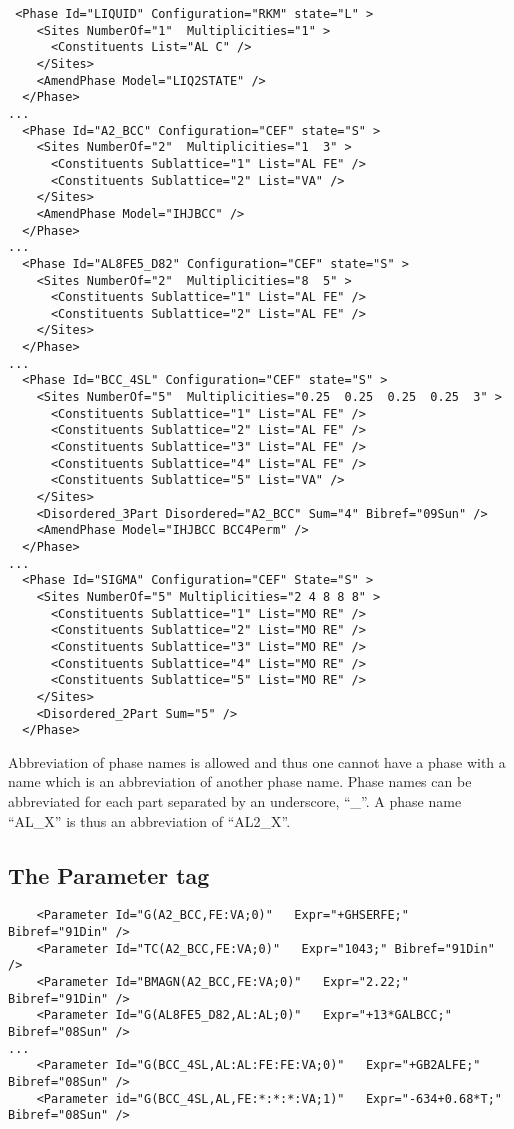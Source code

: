 \documentclass{article}
\begin{document}
\begin{appendices}
{\small
\begin{verbatim}
 <Phase Id="LIQUID" Configuration="RKM" state="L" >
    <Sites NumberOf="1"  Multiplicities="1" >
      <Constituents List="AL C" />
    </Sites>
    <AmendPhase Model="LIQ2STATE" />
  </Phase>
...
  <Phase Id="A2_BCC" Configuration="CEF" state="S" >
    <Sites NumberOf="2"  Multiplicities="1  3" >
      <Constituents Sublattice="1" List="AL FE" />
      <Constituents Sublattice="2" List="VA" />
    </Sites>
    <AmendPhase Model="IHJBCC" />
  </Phase>
...
  <Phase Id="AL8FE5_D82" Configuration="CEF" state="S" >
    <Sites NumberOf="2"  Multiplicities="8  5" >
      <Constituents Sublattice="1" List="AL FE" />
      <Constituents Sublattice="2" List="AL FE" />
    </Sites>
  </Phase>
...
  <Phase Id="BCC_4SL" Configuration="CEF" state="S" >
    <Sites NumberOf="5"  Multiplicities="0.25  0.25  0.25  0.25  3" >
      <Constituents Sublattice="1" List="AL FE" />
      <Constituents Sublattice="2" List="AL FE" />
      <Constituents Sublattice="3" List="AL FE" />
      <Constituents Sublattice="4" List="AL FE" />
      <Constituents Sublattice="5" List="VA" />
    </Sites>
    <Disordered_3Part Disordered="A2_BCC" Sum="4" Bibref="09Sun" />
    <AmendPhase Model="IHJBCC BCC4Perm" />
  </Phase>
...
  <Phase Id="SIGMA" Configuration="CEF" State="S" >
    <Sites NumberOf="5" Multiplicities="2 4 8 8 8" >
      <Constituents Sublattice="1" List="MO RE" />
      <Constituents Sublattice="2" List="MO RE" />
      <Constituents Sublattice="3" List="MO RE" />
      <Constituents Sublattice="4" List="MO RE" />
      <Constituents Sublattice="5" List="MO RE" />
    </Sites>
    <Disordered_2Part Sum="5" />
  </Phase>
\end{verbatim}
}

Abbreviation of phase names is allowed and thus one cannot have a phase
with a name which is an abbreviation of another phase name.  Phase
names can be abbreviated for each part separated by an underscore,
``\_''.  A phase name ``AL\_X'' is thus an abbreviation of ``AL2\_X''.

\subsection{The Parameter tag}\label{sec:parameter examples}

{\small
\begin{verbatim}
    <Parameter Id="G(A2_BCC,FE:VA;0)"   Expr="+GHSERFE;" Bibref="91Din" />
    <Parameter Id="TC(A2_BCC,FE:VA;0)"   Expr="1043;" Bibref="91Din" />
    <Parameter Id="BMAGN(A2_BCC,FE:VA;0)"   Expr="2.22;" Bibref="91Din" />
    <Parameter Id="G(AL8FE5_D82,AL:AL;0)"   Expr="+13*GALBCC;" Bibref="08Sun" />
...
    <Parameter Id="G(BCC_4SL,AL:AL:FE:FE:VA;0)"   Expr="+GB2ALFE;" Bibref="08Sun" />
    <Parameter id="G(BCC_4SL,AL,FE:*:*:*:VA;1)"   Expr="-634+0.68*T;" Bibref="08Sun" />
\end{verbatim}
}


\end{appendices}
\end{document}
